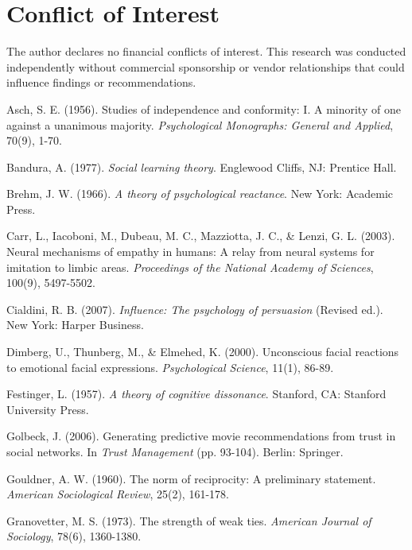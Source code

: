 \documentclass[11pt,a4paper]{article}
\begin{document}
\section*{Conflict of Interest}

The author declares no financial conflicts of interest. This research was conducted independently without commercial sponsorship or vendor relationships that could influence findings or recommendations.

\begin{thebibliography}{99}

Asch, S. E. (1956). Studies of independence and conformity: I. A minority of one against a unanimous majority. \textit{Psychological Monographs: General and Applied}, 70(9), 1-70.

Bandura, A. (1977). \textit{Social learning theory}. Englewood Cliffs, NJ: Prentice Hall.

Brehm, J. W. (1966). \textit{A theory of psychological reactance}. New York: Academic Press.

Carr, L., Iacoboni, M., Dubeau, M. C., Mazziotta, J. C., \& Lenzi, G. L. (2003). Neural mechanisms of empathy in humans: A relay from neural systems for imitation to limbic areas. \textit{Proceedings of the National Academy of Sciences}, 100(9), 5497-5502.

Cialdini, R. B. (2007). \textit{Influence: The psychology of persuasion} (Revised ed.). New York: Harper Business.

Dimberg, U., Thunberg, M., \& Elmehed, K. (2000). Unconscious facial reactions to emotional facial expressions. \textit{Psychological Science}, 11(1), 86-89.

Festinger, L. (1957). \textit{A theory of cognitive dissonance}. Stanford, CA: Stanford University Press.

Golbeck, J. (2006). Generating predictive movie recommendations from trust in social networks. In \textit{Trust Management} (pp. 93-104). Berlin: Springer.

Gouldner, A. W. (1960). The norm of reciprocity: A preliminary statement. \textit{American Sociological Review}, 25(2), 161-178.

Granovetter, M. S. (1973). The strength of weak ties. \textit{American Journal of Sociology}, 78(6), 1360-1380.


\end{thebibliography}
\end{document}

